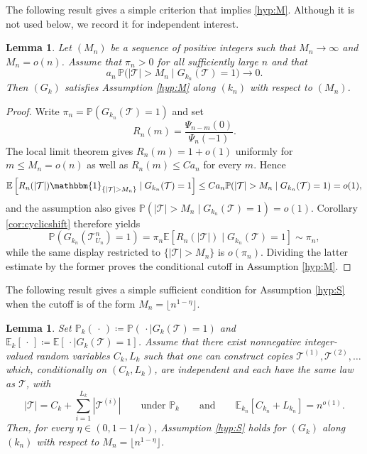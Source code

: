 \documentclass[a4paper,11pt]{article}
\newtheorem{lemma}[theorem]{Lemma}
\newcommand{\E}{\mathbb{E}}
\DeclareRobustCommand{\P}{\mathbb{P}}
\DeclareRobustCommand{\1}{\mathbf{1}}
\begin{document}
 The following result gives a simple criterion that implies \ref{hyp:M}. Although it is not used below, we record it for independent interest.
   
\begin{lemma}
\label{lem:M}
Let $(M_n)$ be a sequence of positive integers such that
$M_n\to\infty$ and $M_n=o(n)$. Assume that $\pi_n>0$ for all sufficiently
large $n$ and that
$$
a_n\,\P\bigl(|\mathcal T|>M_n\mid G_{k_n}(\mathcal T)=1\bigr)
\longrightarrow0.
$$
Then $(G_k)$ satisfies Assumption \ref{hyp:M} along $(k_n)$ with respect to
$(M_n)$.
\end{lemma}

\begin{proof}
Write $\pi_n=\P(G_{k_n}(\mathcal T)=1)$ and set
$$
R_n(m)=\frac{\Psi_{n-m}(0)}{\Psi_n(-1)}.
$$
The local limit theorem gives $R_n(m)=1+o(1)$ uniformly for
$m\le M_n=o(n)$ as well as $R_n(m)\le Ca_n$ for every $m$. Hence
$$
\E\left[R_n(|\mathcal T|)
\mathbbm{1}_{\{|\mathcal T|>M_n\}} \mid G_{k_n}(\mathcal T)=1 \right]
\le Ca_n\P(|\mathcal T|>M_n \mid G_{k_n}(\mathcal T)=1)=o(1),
$$
and the assumption also gives $\P(|\mathcal T|>M_n \mid G_{k_n}(\mathcal T)=1)=o(1)$.
Corollary \ref{cor:cyclicshift} therefore yields
$$
\P(G_{k_n}(\mathcal T^n_{U_n})=1)
=\pi_n\E[R_n(|\mathcal T|)  \mid G_{k_n}(\mathcal T)=1]\sim\pi_n,
$$
while the same display restricted to $\{|\mathcal T|>M_n\}$ is
$o(\pi_n)$. Dividing the latter estimate by the former proves the
conditional cutoff in Assumption \ref{hyp:M}.
\end{proof}
 
The following result gives a simple sufficient condition for Assumption
\ref{hyp:S}  when the cutoff is of the
form $M_n=\lfloor n^{1-\eta}\rfloor$.

\begin{lemma}
\label{lem:critM}
Set $
  \P_k(\,\cdot\,)
  \coloneqq
  \P(\,\cdot\mid G_k(\mathcal T)=1)$ and $  \E_k[\,\cdot\,]
  \coloneqq
  \E[\,\cdot\mid G_k(\mathcal T)=1]$. Assume that
there exist nonnegative integer-valued random variables $C_k,L_k$ such that
one can construct copies $\mathcal T^{(1)},\mathcal T^{(2)},\ldots$ which,
conditionally on $(C_k,L_k)$, are independent and each have the same law
as $\mathcal T$, with
$$
  |\mathcal T|
  =
  C_k+\sum_{i=1}^{L_k}|\mathcal T^{(i)}|
  \qquad\text{under }\P_k \qquad  \textrm{and} \qquad 
  \E_{k_n}[C_{k_n}+L_{k_n}]
  =
  n^{o(1)}.
$$
Then, for every $\eta\in(0,1-1/\alpha)$, Assumption \ref{hyp:S} holds for
$(G_k)$ along $(k_n)$ with respect to $
  M_n=\lfloor n^{1-\eta}\rfloor$.
\end{lemma}
\end{document}
